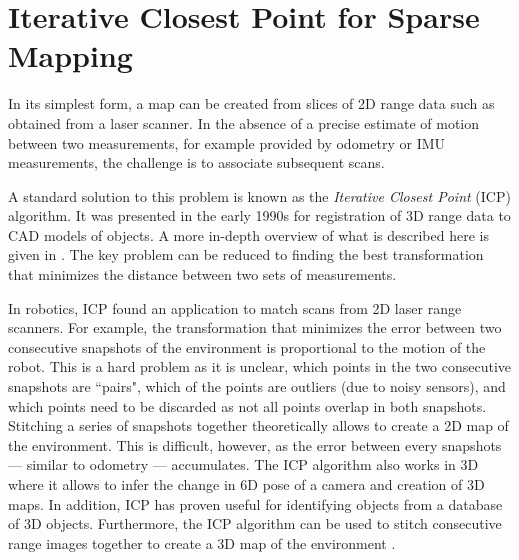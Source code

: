 \section{Iterative Closest Point for Sparse Mapping}\label{sec:ICP}
In its simplest form, a map can be created from slices of 2D range data such as obtained from a laser scanner. In the absence of a precise estimate of motion between two measurements, for example provided by odometry or IMU measurements, the challenge is to associate subsequent scans. 

A standard solution to this problem is known as the \emph{Iterative Closest Point} (ICP) algorithm. It was presented in the early 1990s for registration of 3D range data to CAD models of objects. A more in-depth overview of what is described here is given in \cite{rusinkiewicz01}. The key problem can be reduced to finding the best transformation that minimizes the distance between two sets of measurements.

In robotics, ICP found an application to match scans from 2D laser range
scanners. For example, the transformation that minimizes the error between two
consecutive snapshots of the environment is proportional to the motion of the
robot. This is a hard problem as it is unclear, which points in the two
consecutive snapshots are ``pairs", which of the points are outliers (due to
noisy sensors), and which points need to be discarded as not all points overlap
in both snapshots. Stitching a series of snapshots together theoretically
allows to create a 2D map of the environment. This is difficult, however, as
the error between every snapshots --- similar to odometry --- accumulates.
The ICP algorithm also works in 3D where it allows to infer the change in 6D
pose of a camera and creation of 3D maps. In addition, ICP has proven useful
for identifying objects from a database of 3D objects. Furthermore, the ICP
algorithm can be used to stitch consecutive range images together to create a
3D map of the environment \cite{henry2010rgb}. 

